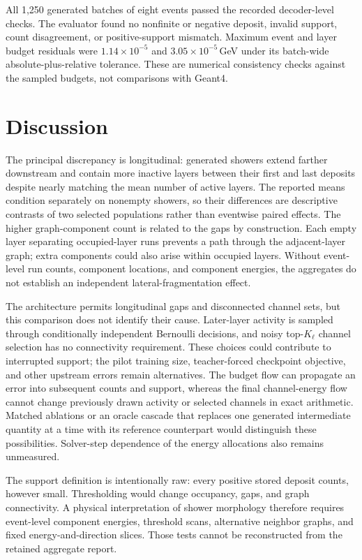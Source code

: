\documentclass[11pt]{article}
\begin{document}
All 1,250 generated batches of eight events passed the recorded decoder-level checks. The evaluator found no nonfinite or negative deposit, invalid support, count disagreement, or positive-support mismatch. Maximum event and layer budget residuals were $1.14\times10^{-5}$ and $3.05\times10^{-5}$\,GeV under its batch-wide absolute-plus-relative tolerance. These are numerical consistency checks against the sampled budgets, not comparisons with Geant4.

\section{Discussion}
\label{sec:discussion}

The principal discrepancy is longitudinal: generated showers extend farther downstream and contain more inactive layers between their first and last deposits despite nearly matching the mean number of active layers. The reported means condition separately on nonempty showers, so their differences are descriptive contrasts of two selected populations rather than eventwise paired effects. The higher graph-component count is related to the gaps by construction. Each empty layer separating occupied-layer runs prevents a path through the adjacent-layer graph; extra components could also arise within occupied layers. Without event-level run counts, component locations, and component energies, the aggregates do not establish an independent lateral-fragmentation effect.

The architecture permits longitudinal gaps and disconnected channel sets, but this comparison does not identify their cause. Later-layer activity is sampled through conditionally independent Bernoulli decisions, and noisy top-$K_\ell$ channel selection has no connectivity requirement. These choices could contribute to interrupted support; the pilot training size, teacher-forced checkpoint objective, and other upstream errors remain alternatives. The budget flow can propagate an error into subsequent counts and support, whereas the final channel-energy flow cannot change previously drawn activity or selected channels in exact arithmetic. Matched ablations or an oracle cascade that replaces one generated intermediate quantity at a time with its reference counterpart would distinguish these possibilities. Solver-step dependence of the energy allocations also remains unmeasured.

The support definition is intentionally raw: every positive stored deposit counts, however small. Thresholding would change occupancy, gaps, and graph connectivity. A physical interpretation of shower morphology therefore requires event-level component energies, threshold scans, alternative neighbor graphs, and fixed energy-and-direction slices. Those tests cannot be reconstructed from the retained aggregate report.
\end{document}
